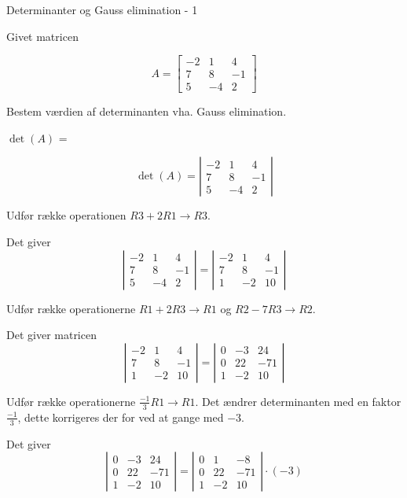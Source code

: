 \documentclass{article}
\begin{document}
\begin{exercise}{Determinanter og Gauss elimination - 1}

Givet matricen

\[
A = \left[\begin{array}{rrr}
-2 & 1 & 4 \\
7 & 8 & -1 \\
5 & -4 & 2
\end{array} \right]
\]

Bestem værdien af determinanten vha. Gauss elimination.

$\det(A)$ = 


\hint
\[
\det(A) = \left|\begin{array}{rrr}
-2 & 1 & 4 \\
7 & 8 & -1 \\
5 & -4 & 2
\end{array} \right|
\]


\hint
Udfør række operationen
$R3 + 2R1 \to R3$.

\hint
Det giver
\[
\left|\begin{array}{rrr}
-2 & 1 & 4 \\
7 & 8 & -1 \\
5 & -4 & 2
\end{array} \right|
=
\left|\begin{array}{rrr}
-2 & 1 & 4 \\
7 & 8 & -1 \\
1 & -2 & 10
\end{array} \right|
\]

\hint
Udfør række operationerne
$R1 + 2R3 \to R1$ og $R2 - 7R3 \to R2$.

\hint
Det giver matricen
\[
\left|\begin{array}{rrr}
-2 & 1 & 4 \\
7 & 8 & -1 \\
1 & -2 & 10
\end{array} \right| =
\left|\begin{array}{rrr}
0 & -3 & 24 \\
0 & 22 & -71 \\
1 & -2 & 10
\end{array} \right|
\]

\hint
Udfør række operationerne
$\frac{-1}{3} R1 \to R1$.
Det ændrer determinanten med en faktor $\frac{-1}{3}$,
dette korrigeres der for ved at gange med $ -3$.

\hint
Det giver
\[
\left|\begin{array}{rrr}
0 & -3 & 24 \\
0 & 22 & -71 \\
1 & -2 & 10
\end{array} \right| =
\left|\begin{array}{rrr}
0 & 1 & -8 \\
0 & 22 & -71 \\
1 & -2 & 10
\end{array} \right| \cdot (-3)
\]


\end{exercise}
\end{document}
